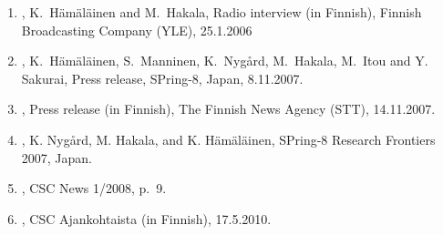 \documentclass[12pt,a4]{report}
\begin{document}
%
%
%


\vspace{0.4cm}





\begin{enumerate}

\item {}, K.~H\"am\"al\"ainen and M.~Hakala, Radio interview (in Finnish), Finnish Broadcasting Company (YLE), 25.1.2006

\item {}, K.~H\"am\"al\"ainen, S.~Manninen, K.~Ny\-g{\aa}rd, M.~Hakala, M.~Itou and Y. Sakurai, Press release, SPring-8, Japan, 8.11.2007.

\item {}, Press release (in Finnish), The Finnish News Agency (STT), 14.11.2007.

\item {}, K. Nyg{\aa}rd, M. Hakala, and K. H\"am\"al\"ainen, SPring-8 Research Frontiers 2007, Japan.

\item {}, CSC News 1/2008, p.~9.

\item {}, CSC Ajankohtaista (in Finnish), 17.5.2010.


\end{enumerate}
\end{document}
